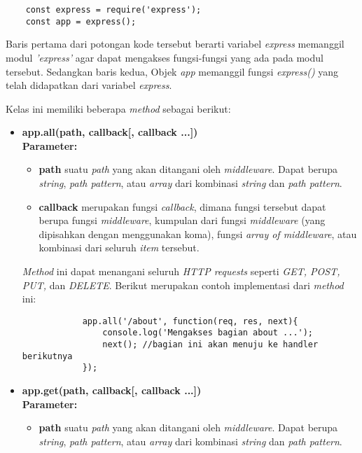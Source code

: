 \begin{lstlisting}
	const express = require('express');
	const app = express();
\end{lstlisting}

Baris pertama dari potongan kode tersebut berarti variabel \textit{express} memanggil modul \textit{'express'} agar dapat mengakses fungsi-fungsi yang ada pada modul tersebut. Sedangkan baris kedua, Objek \textit{app} memanggil fungsi \textit{express()} yang telah didapatkan dari variabel \textit{express}.

Kelas ini memiliki beberapa \textit{method} sebagai berikut:

\begin{itemize}
	\item \textbf{app.all(path, callback[, callback ...])} \\ \textbf{Parameter:} 
		\begin{itemize}
			\item \textbf{path} suatu \textit{path} yang akan ditangani oleh \textit{middleware}. Dapat berupa \textit{string}, \textit{path pattern}, atau \textit{array} dari kombinasi \textit{string} dan \textit{path pattern}.
			
			\item \textbf{callback} merupakan fungsi \textit{callback}, dimana fungsi tersebut dapat berupa fungsi \textit{middleware}, kumpulan dari fungsi \textit{middleware} (yang dipisahkan dengan menggunakan koma), fungsi \textit{array of middleware}, atau kombinasi dari seluruh \textit{item} tersebut.
		\end{itemize}
	
		\textit{Method} ini dapat menangani seluruh \textit{HTTP requests} seperti \textit{GET, POST, PUT,} dan \textit{DELETE}. Berikut merupakan contoh implementasi dari \textit{method} ini:
		\begin{lstlisting}
			app.all('/about', function(req, res, next){
				console.log('Mengakses bagian about ...');
				next(); //bagian ini akan menuju ke handler berikutnya
			});
		\end{lstlisting}
	
	\item \textbf{app.get(path, callback[, callback ...])} \\ \textbf{Parameter:}
		\begin{itemize}
			\item \textbf{path} suatu \textit{path} yang akan ditangani oleh \textit{middleware}. Dapat berupa \textit{string}, \textit{path pattern}, atau \textit{array} dari kombinasi \textit{string} dan \textit{path pattern}.
			

\end{itemize}
\end{itemize}
